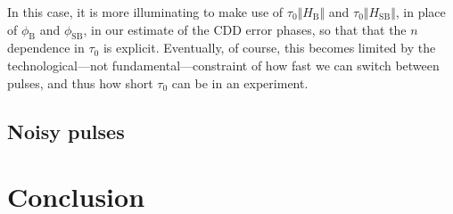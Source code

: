 \documentclass[twocolumn,pra,superscriptaddress]{revtex4-2}
\newcommand{\HB}{H_\mathrm{B}}
\newcommand{\HSB}{H_\mathrm{SB}}
\newcommand{\phiSB}{\phi_\mathrm{SB}}
\newcommand{\phiB}{\phi_\mathrm{B}}
\begin{document}
In this case, it is more illuminating to make use of $\tau_0\Vert \HB\Vert$ and $\tau_0\Vert\HSB\Vert$, in place of $\phiB$ and $\phiSB$, in our estimate of the CDD error phases, so that that the $n$ dependence in $\tau_0$ is explicit. 
Eventually, of course, this becomes limited by the technological---not fundamental---constraint of how fast we can switch between pulses, and thus how short $\tau_0$ can be in an experiment.


\subsection{Noisy pulses}


\section{Conclusion}




\acknowledgments
{}



\appendix
\end{document}
